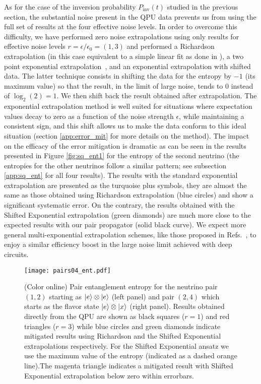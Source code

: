 \documentclass[Dual]{msu-thesis}
\begin{document}
As for the case of the inversion probability $P_{\text{inv}}(t)$ studied in the previous section, the substantial noise present in the QPU data prevents us from using the full set of results at the four effective noise levels. In order to overcome this difficulty, we have performed zero noise extrapolations using only results for effective noise levels $r=\epsilon/\epsilon_0=(1,3)$ and performed a Richardson extrapolation (in this case equivalent to a simple linear fit as done in \cite{Dumitrescu2018}), a two point exponential extrapolation~\cite{Endo2018}, and an exponential extrapolation with shifted data. The latter technique consists in shifting the data for the entropy by $-1$ (its maximum value) so that the result, in the limit of large noise, tends to 0 instead of $\log_2(2)=1$. We then shift back the result obtained after extrapolation. The exponential extrapolation method is well suited for situations where expectation values decay to zero as a function of the noise strength $\epsilon$, while maintaining a consistent sign, and this shift allows us to make the data conform to this ideal situation (section \ref{app:error_mit} for more details on the method). The impact on the efficacy of the error mitigation is dramatic as can be seen in the results presented in Figure \ref{fig:sq_ent1} for the entropy of the second neutrino (the entropies for the other neutrinos follow a similar pattern; see subsection \ref{app:sq_ent} for all four results). The results with the standard exponential extrapolation are presented as the turquoise plus symbols, they are almost the same as those obtained using Richardson extrapolation (blue circles) and show a significant systematic error. On the contrary, the results obtained with the Shifted Exponential extrapolation (green diamonds) are much more close to the expected results with our pair propagator (solid black curve). We expect more general multi-exponential extrapolation schemes, like those proposed in Refs.~\cite{giurgicatiron2020,cai2020}, to enjoy a similar efficiency boost in the large noise limit achieved with deep circuits.

\begin{figure}
 \centering
 \texttt{[image: pairs04\_ent.pdf]}
 \caption{(Color online) Pair entanglement entropy for the neutrino pair $(1,2)$ starting as $\ket{e}\otimes\ket{e}$ (left panel) and pair $(2,4)$ which starts as the flavor state $\ket{e}\otimes\ket{x}$ (right panel). Results obtained directly from the QPU are shown as black squares ($r=1$) and red triangles ($r=3$) while blue circles and green diamonds indicate mitigated results using Richardson and the Shifted Exponential extrapolations respectively. For the Shifted Exponential ansatz we use the maximum value of the entropy (indicated as a dashed orange line).The magenta triangle indicates a mitigated result with Shifted Exponential extrapolation below zero within errorbars.}
\label{fig:pair_ent_04}
\end{figure}
\end{document}
